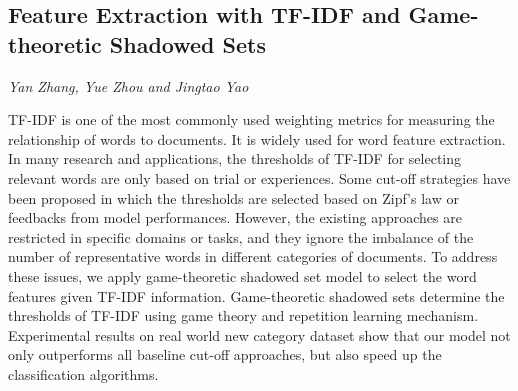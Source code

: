 \documentclass[../booklet.tex]{subfiles}
\begin{document}
\subsection[Feature Extraction with TF-IDF and Game-theoretic Shadowed Sets. {\it Yan Zhang, Yue Zhou and Jingtao Yao}]{Feature Extraction with TF-IDF and Game-theoretic Shadowed Sets}
  

\begin{center}
  {\it Yan Zhang, Yue Zhou and Jingtao Yao}
\end{center}




TF-IDF is one of the most commonly used weighting metrics for measuring the relationship of words to documents. It is widely used for word feature extraction. In many research and applications, the thresholds of TF-IDF for selecting relevant words are only based on trial or experiences. Some cut-off strategies have been proposed in which the thresholds are selected based on Zipf's law or feedbacks from model performances.
However, the existing approaches are restricted in specific domains or tasks, and they ignore the imbalance of the number of representative words in different categories of documents. To address these issues, we apply game-theoretic shadowed set model to select the word features given TF-IDF information.
Game-theoretic shadowed sets determine the thresholds of TF-IDF using game theory and repetition learning mechanism.
Experimental results on real world new category dataset show that our model not only outperforms all baseline cut-off approaches, but also speed up the classification algorithms.


\end{document}
